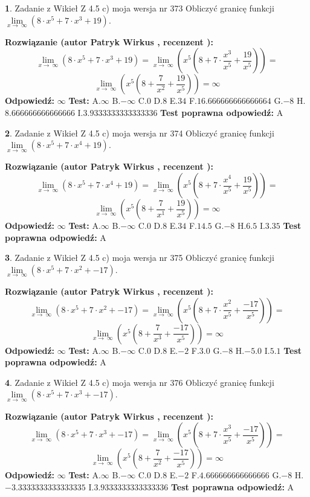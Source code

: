\documentclass[12pt, a4paper]{article}
\theoremstyle{definition} %
\newtheorem{zad}{}
\newcommand{\zadStart}[1]{\begin{zad}#1\newline}
\newcommand{\zadStop}{\end{zad}}
\newcommand{\rozwStart}[2]{\noindent \textbf{Rozwiązanie (autor #1 , recenzent #2): }\newline}
\newcommand{\rozwStop}{\newline}
\newcommand{\odpStart}{\noindent \textbf{Odpowiedź:}\newline}
\newcommand{\odpStop}{\newline}
\newcommand{\testStart}{\noindent \textbf{Test:}\newline}
\newcommand{\testStop}{\newline}
\newcommand{\kluczStart}{\noindent \textbf{Test poprawna odpowiedź:}\newline}
\newcommand{\kluczStop}{\newline}
\begin{document}
\zadStart{Zadanie z Wikieł Z 4.5 c) moja wersja nr 373}
Obliczyć granicę funkcji  $\lim\limits_{x\to\ \infty}(8 \cdot x^{5}+7 \cdot x^{3}+19)$.
\zadStop
\rozwStart{Patryk Wirkus}{}
$$\lim\limits_{x\to\ \infty}(8 \cdot x^{5}+7 \cdot x^{3}+19) = \lim\limits_{x\to\ \infty}(x^{5}(8 +7 \cdot \frac{x^{3}}{x^{5}}+\frac{19}{x^{5}})) =$$ $$\lim\limits_{x\to\ \infty}(x^{5}(8 +\frac{7}{x^{2}}+\frac{19}{x^{5}})) =\infty$$
\rozwStop
\odpStart
$\infty$
\odpStop
\testStart
A.$\infty$ B.$-\infty$ C.$0$ D.$8$ E.$34$
F.$16.666666666666664$ G.$-8$
H.$8.666666666666666$
I.$3.9333333333333336$
\testStop
\kluczStart
A
\kluczStop



\zadStart{Zadanie z Wikieł Z 4.5 c) moja wersja nr 374}
Obliczyć granicę funkcji  $\lim\limits_{x\to\ \infty}(8 \cdot x^{5}+7 \cdot x^{4}+19)$.
\zadStop
\rozwStart{Patryk Wirkus}{}
$$\lim\limits_{x\to\ \infty}(8 \cdot x^{5}+7 \cdot x^{4}+19) = \lim\limits_{x\to\ \infty}(x^{5}(8 +7 \cdot \frac{x^{4}}{x^{5}}+\frac{19}{x^{5}})) =$$ $$\lim\limits_{x\to\ \infty}(x^{5}(8 +\frac{7}{x^{1}}+\frac{19}{x^{5}})) =\infty$$
\rozwStop
\odpStart
$\infty$
\odpStop
\testStart
A.$\infty$ B.$-\infty$ C.$0$ D.$8$ E.$34$
F.$14.5$ G.$-8$
H.$6.5$
I.$3.35$
\testStop
\kluczStart
A
\kluczStop



\zadStart{Zadanie z Wikieł Z 4.5 c) moja wersja nr 375}
Obliczyć granicę funkcji  $\lim\limits_{x\to\ \infty}(8 \cdot x^{5}+7 \cdot x^{2}+-17)$.
\zadStop
\rozwStart{Patryk Wirkus}{}
$$\lim\limits_{x\to\ \infty}(8 \cdot x^{5}+7 \cdot x^{2}+-17) = \lim\limits_{x\to\ \infty}(x^{5}(8 +7 \cdot \frac{x^{2}}{x^{5}}+\frac{-17}{x^{5}})) =$$ $$\lim\limits_{x\to\ \infty}(x^{5}(8 +\frac{7}{x^{3}}+\frac{-17}{x^{5}})) =\infty$$
\rozwStop
\odpStart
$\infty$
\odpStop
\testStart
A.$\infty$ B.$-\infty$ C.$0$ D.$8$ E.$-2$
F.$3.0$ G.$-8$
H.$-5.0$
I.$5.1$
\testStop
\kluczStart
A
\kluczStop



\zadStart{Zadanie z Wikieł Z 4.5 c) moja wersja nr 376}
Obliczyć granicę funkcji  $\lim\limits_{x\to\ \infty}(8 \cdot x^{5}+7 \cdot x^{3}+-17)$.
\zadStop
\rozwStart{Patryk Wirkus}{}
$$\lim\limits_{x\to\ \infty}(8 \cdot x^{5}+7 \cdot x^{3}+-17) = \lim\limits_{x\to\ \infty}(x^{5}(8 +7 \cdot \frac{x^{3}}{x^{5}}+\frac{-17}{x^{5}})) =$$ $$\lim\limits_{x\to\ \infty}(x^{5}(8 +\frac{7}{x^{2}}+\frac{-17}{x^{5}})) =\infty$$
\rozwStop
\odpStart
$\infty$
\odpStop
\testStart
A.$\infty$ B.$-\infty$ C.$0$ D.$8$ E.$-2$
F.$4.666666666666666$ G.$-8$
H.$-3.3333333333333335$
I.$3.9333333333333336$
\testStop
\kluczStart
A
\kluczStop
\end{document}
